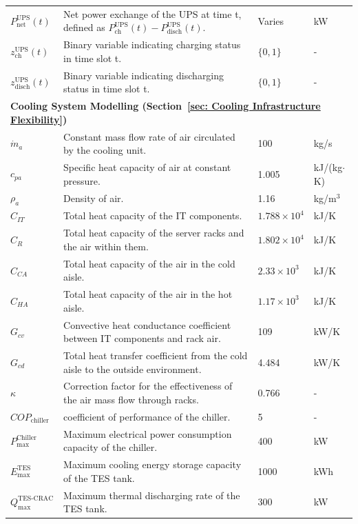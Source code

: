 \documentclass[lettersize,journal]{IEEEtran}
\begin{document}
{{\begin{longtable}{p{} p{} p{} p{}}
$P^{\mathrm{UPS}}_{\mathrm{net}}(t)$ & Net power exchange of the UPS at time t, defined as $P^{\mathrm{UPS}}_{\mathrm{ch}}(t) - P^{\mathrm{UPS}}_{\mathrm{disch}}(t)$. & Varies &kW \\
$z^{\mathrm{UPS}}_{\mathrm{ch}}(t)$ & Binary variable indicating charging status in time slot t. & $\{0, 1\}$ & - \\
$z^{\mathrm{UPS}}_{\mathrm{disch}}(t)$ & Binary variable indicating discharging status in time slot t. & $\{0, 1\}$ & - \\

\midrule
\multicolumn{4}{l}{\textbf{Cooling System Modelling (Section~\ref{sec: Cooling Infrastructure Flexibility})}} \\
\midrule
$\dot{m}_a$ & Constant mass flow rate of air circulated by the cooling unit. & 100 & kg/s \\
$c_{pa}$ & Specific heat capacity of air at constant pressure. & 1.005 & kJ/(kg$\cdot$K) \\
$\rho_a$ & Density of air. & 1.16 & kg/m$^3$ \\
$C_{IT}$ & Total heat capacity of the IT components. & $1.788 \times 10^4$ & kJ/K \\
$C_R$ & Total heat capacity of the server racks and the air within them. & $1.802 \times 10^4$ & kJ/K \\
$C_{CA}$ & Total heat capacity of the air in the cold aisle. & $2.33 \times 10^3$ & kJ/K \\
$C_{HA}$ & Total heat capacity of the air in the hot aisle. & $1.17 \times 10^3$ & kJ/K \\
$G_{cv}$ & Convective heat conductance coefficient between IT components and rack air. & 109 &kW/K \\
$G_{cd}$ & Total heat transfer coefficient from the cold aisle to the outside environment. & 4.484 &kW/K \\
$\kappa$ & Correction factor for the effectiveness of the air mass flow through racks. & 0.766 & - \\
$COP_{\mathrm{chiller}}$ & coefficient of performance of the chiller. & 5 & - \\
$P^{\mathrm{Chiller}}_{\mathrm{max}}$ & Maximum electrical power consumption capacity of the chiller. & 400 &kW \\
$E^{\mathrm{TES}}_{\mathrm{max}}$ & Maximum cooling energy storage capacity of the TES tank. & 1000 &kWh \\
$Q^{\mathrm{TES}\text{-}\mathrm{CRAC}}_{\mathrm{max}}$ & Maximum thermal discharging rate of the TES tank. & 300 &kW \\

\end{longtable}}}
\end{document}
